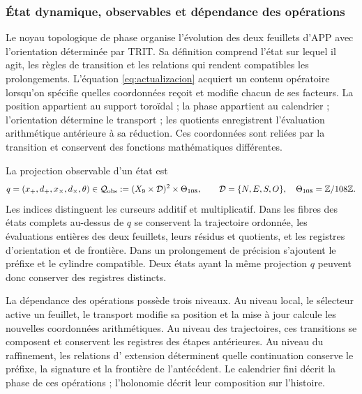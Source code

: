 
\subsubsection{État dynamique, observables et dépendance des opérations}
\label{tpk-int:estado}

Le noyau topologique de phase organise l'évolution des deux feuillets d'APP avec l'orientation déterminée par TRIT. Sa définition comprend l'état sur lequel il agit, les règles de transition et les relations qui rendent compatibles les prolongements. L'équation \eqref{eq:actualizacion} acquiert un contenu opératoire lorsqu'on spécifie quelles coordonnées reçoit et modifie chacun de ses facteurs. La position appartient au support toroïdal ; la phase appartient au calendrier ; l'orientation détermine le transport ; les quotients enregistrent l'évaluation arithmétique antérieure à sa réduction. Ces coordonnées sont reliées par la transition et conservent des fonctions mathématiques différentes.

La projection observable d'un état est
\begin{equation}
 q=(x_+,d_+,x_\times,d_\times,\theta)
 \in\mathcal Q_{\rm obs}
 :=(X_9\times\mathcal D)^2\times\Theta_{108},
 \qquad \mathcal D=\{N,E,S,O\},\quad
 \Theta_{108}=\mathbb Z/108\mathbb Z.
 \label{tpk-int:qobs}
\end{equation}
Les indices distinguent les curseurs additif et multiplicatif. Dans les
fibres des états complets au-dessus de \(q\) se conservent la trajectoire ordonnée, les évaluations
entières des deux feuillets, leurs résidus et quotients, et les registres
d'orientation et de frontière. Dans un prolongement de précision s'ajoutent le
préfixe et le cylindre compatible. Deux états ayant la même
projection \(q\) peuvent donc conserver des registres distincts.

La dépendance des opérations possède trois niveaux. Au niveau local,
le sélecteur active un feuillet, le transport modifie sa position et la
mise à jour calcule les nouvelles coordonnées arithmétiques. Au niveau des
trajectoires, ces transitions se composent et conservent les registres des
étapes antérieures. Au niveau du raffinement, les relations d'
extension déterminent quelle continuation conserve le préfixe, la signature et la
frontière de l'antécédent. Le calendrier fini décrit la phase de ces
opérations ; l'holonomie décrit leur composition sur l'histoire.

